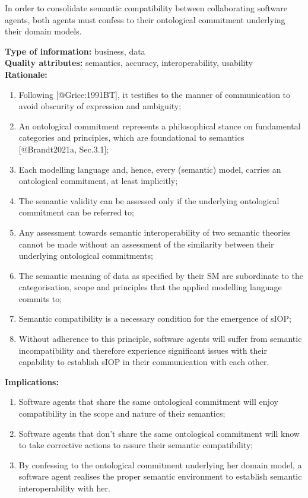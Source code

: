 \documentclass[sort&compress,preprint,authoryear,3p,twocolumn]{elsarticle}
\begin{document}
\begin{mmdp}\label{dp:scp}

In order to consolidate semantic compatibility between collaborating software agents, both agents must confess to their ontological commitment underlying their domain models.

\textbf{Type of information:} business, data  \\
\textbf{Quality attributes:} semantics, accuracy, interoperability, usability   \\
\textbf{Rationale:}
\begin{enumerate}
  \item Following [@Grice:1991BT], it testifies to the manner of communication to avoid obscurity of expression and ambiguity;
  \item An ontological commitment represents a philosophical stance on fundamental categories and principles, which are foundational to semantics [@Brandt2021a, Sec.3.1];
  \item Each modelling language and, hence, every (semantic) model, carries an ontological commitment, at least implicitly;
  \item The semantic validity can be assessed only if the underlying ontological commitment can be referred to;
  \item Any assessment towards semantic interoperability of two semantic theories cannot be made without an assessment of the similarity between their underlying ontological commitments;
  \item The semantic meaning of data as specified by their SM are subordinate to the categorisation, scope and principles that the applied modelling language commits to; 
  \item Semantic compatibility is a necessary condition for the emergence of sIOP; 
  \item Without adherence to this principle, software agents will suffer from semantic incompatibility and therefore experience significant issues with their capability to establish sIOP in their communication with each other.
\end{enumerate}
\textbf{Implications:}
\begin{enumerate}
  \item Software agents that share the same ontological commitment will enjoy compatibility in the scope and nature of their semantics;
  \item Software agents that don't share the same ontological commitment will know to take corrective actions to assure their semantic compatibility;
  \item By confessing to the ontological commitment underlying her domain model, a software agent realises the proper semantic environment to establish semantic interoperability with her.
\end{enumerate}  
\end{mmdp}
\end{document}
